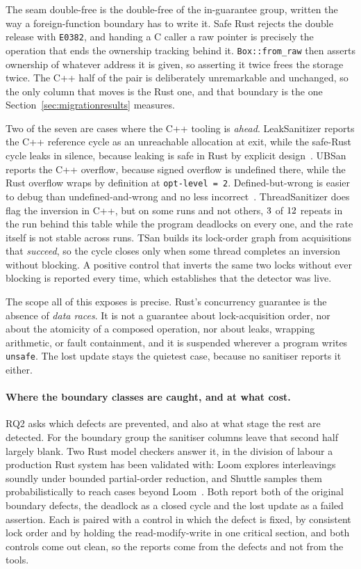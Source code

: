 \documentclass[english,oneside,a4paper,censored,csm,software-track-2020]{HYthesisML}
\begin{document}
The seam double-free is the double-free of the in-guarantee group, written the way a
foreign-function boundary has to write it. Safe Rust rejects the double release with
\texttt{E0382}, and handing a C caller a raw pointer is precisely the operation that ends the
ownership tracking behind it. \texttt{Box::from\_raw} then asserts ownership of whatever address
it is given, so asserting it twice frees the storage twice. The C++ half of the pair is
deliberately unremarkable and unchanged, so the only column that moves is the Rust one, and that
boundary is the one Section~\ref{sec:migrationresults} measures.

Two of the seven are cases where the C++ tooling is \emph{ahead}. LeakSanitizer reports the C++
reference cycle as an unreachable allocation at exit, while the safe-Rust cycle leaks in silence,
because leaking is safe in Rust by explicit design~\cite{hughes2025gcrust,cui2024rcanary}. UBSan
reports the C++ overflow, because signed overflow is undefined there, while the Rust overflow
wraps by definition at \texttt{opt-level~=~2}. Defined-but-wrong is
easier to debug than undefined-and-wrong and no less incorrect~\cite{dietz2015overflow}.
ThreadSanitizer does flag the inversion in C++, but on some runs and not others,
$3$ of $12$ repeats in the run behind this table while the program
deadlocks on every one, and the rate itself is not stable across runs. TSan builds its lock-order
graph from acquisitions that \emph{succeed}, so the cycle closes only when some thread completes
an inversion without blocking. A positive control that inverts the same two locks without ever
blocking is reported every time, which establishes that the detector was live.

The scope all of this exposes is precise. Rust's concurrency guarantee is the absence of
\emph{data races}. It is not a guarantee about lock-acquisition order, nor about the atomicity of a
composed operation, nor about leaks, wrapping arithmetic, or fault containment, and it is
suspended wherever a program writes \texttt{unsafe}. The lost update stays the quietest case,
because no sanitiser reports it either.

\paragraph{Where the boundary classes are caught, and at what cost.}
RQ2 asks which defects are prevented, and also at what stage the rest are detected. For
the boundary group the sanitiser columns leave that second half largely blank. Two Rust model
checkers answer it, in the division of labour a production Rust system has been validated
with: Loom explores interleavings soundly under bounded partial-order reduction, and Shuttle
samples them probabilistically to reach cases beyond Loom~\cite{bornholt2021shardstore}. Both
report both of the original boundary defects, the deadlock as a closed cycle and the lost update
as a failed assertion. Each is paired with a control in which the defect is fixed, by consistent
lock order and by holding the read-modify-write in one critical section, and both controls come
out clean, so the reports come from the defects and not from the tools.
\end{document}
